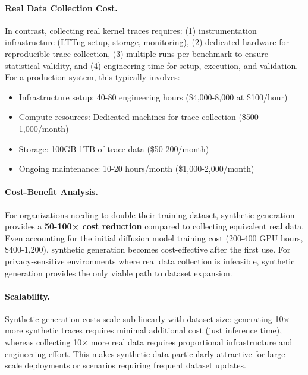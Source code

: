 \paragraph{Real Data Collection Cost.} In contrast, collecting real kernel traces requires: (1) instrumentation infrastructure (LTTng setup, storage, monitoring), (2) dedicated hardware for reproducible trace collection, (3) multiple runs per benchmark to ensure statistical validity, and (4) engineering time for setup, execution, and validation. For a production system, this typically involves:
\begin{itemize}[nosep,leftmargin=*]
    \item Infrastructure setup: 40-80 engineering hours (\$4,000-8,000 at \$100/hour)
    \item Compute resources: Dedicated machines for trace collection (\$500-1,000/month)
    \item Storage: 100GB-1TB of trace data (\$50-200/month)
    \item Ongoing maintenance: 10-20 hours/month (\$1,000-2,000/month)
\end{itemize}

\paragraph{Cost-Benefit Analysis.} For organizations needing to double their training dataset, synthetic generation provides a \textbf{50-100× cost reduction} compared to collecting equivalent real data. Even accounting for the initial diffusion model training cost (200-400 GPU hours, \$400-1,200), synthetic generation becomes cost-effective after the first use. For privacy-sensitive environments where real data collection is infeasible, synthetic generation provides the only viable path to dataset expansion.

\paragraph{Scalability.} Synthetic generation costs scale sub-linearly with dataset size: generating 10× more synthetic traces requires minimal additional cost (just inference time), whereas collecting 10× more real data requires proportional infrastructure and engineering effort. This makes synthetic data particularly attractive for large-scale deployments or scenarios requiring frequent dataset updates.